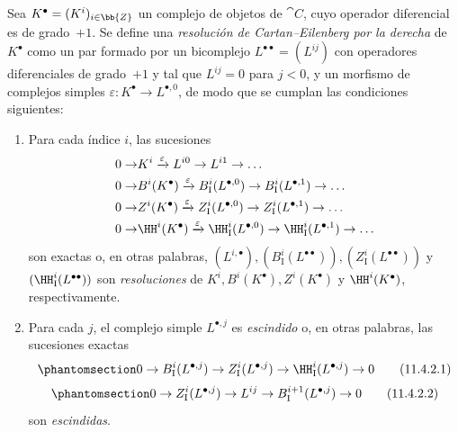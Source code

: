 \documentclass[oneside]{amsart}
\newcommand{\oldpage}[2][]{{\marginnote{\normalfont\textbf{#1}~|~#2}}\ignorespaces}
\let\EGAOriginalLabel\label
\renewcommand{\label}[1]{\phantomsection\EGAOriginalLabel{#1}}
\begin{document}
\begin{env}[11.4.2]
\label{0.11.4.2}
Sea $K^\bullet = (K^i)_{i\in\bb{Z}}$ un complejo de objetos de $\cat{C}$, cuyo operador diferencial es de grado~$+1$.
Se define una \emph{resolución de Cartan--Eilenberg por la derecha} de $K^\bullet$ como un par formado por un bicomplejo $L^{\bullet\bullet} = (L^{ij})$ con operadores diferenciales de grado~$+1$ y tal que $L^{ij}=0$ para $j<0$, y un morfismo de complejos simples $\varepsilon: K^\bullet \rightarrow L^{\bullet, 0}$, de modo que se cumplan las condiciones siguientes:
\oldpage[0\textsubscript{III}]{33}
\begin{enumerate}
  \item[(i)] Para cada índice $i$, las sucesiones
    \[
      \begin{aligned}
        0 \rightarrow
        & K^i
        \xrightarrow{\varepsilon} L^{i0}
        \rightarrow L^{i1}
        \rightarrow \ldots
      \\0 \rightarrow
        & B^i(K^\bullet)
        \xrightarrow{\varepsilon} B_\mathrm{I}^i(L^{\bullet,0})
        \rightarrow B_\mathrm{I}^i(L^{\bullet,1})
        \rightarrow \ldots
      \\0 \rightarrow
        & Z^i(K^\bullet)
        \xrightarrow{\varepsilon} Z_\mathrm{I}^i(L^{\bullet,0})
        \rightarrow Z_\mathrm{I}^i(L^{\bullet,1})
        \rightarrow \ldots
      \\0 \rightarrow
        & \HH^i(K^\bullet)
        \xrightarrow{\varepsilon} \HH_\mathrm{I}^i(L^{\bullet,0})
        \rightarrow \HH_\mathrm{I}^i(L^{\bullet,1})
        \rightarrow \ldots
      \end{aligned}
    \]
    son exactas o, en otras palabras, $(L^{i,\bullet}), (B_\mathrm{I}^i(L^{\bullet\bullet})), (Z_\mathrm{I}^i(L^{\bullet\bullet}))$ y $(\HH_\mathrm{I}^i(L^{\bullet\bullet}))$ son \emph{resoluciones} de $K^i, B^i(K^\bullet), Z^i(K^\bullet)$ y $\HH^i(K^\bullet)$, respectivamente.
  \item[(ii)] Para cada $j$, el complejo simple $L^{\bullet, j}$ es \emph{escindido} o, en otras palabras, las sucesiones exactas
    \[
      \label{0.11.4.2.1}
      0 \rightarrow B_\mathrm{I}^i(L^{\bullet,j}) \rightarrow Z_\mathrm{I}^i(L^{\bullet,j}) \rightarrow \HH_\mathrm{I}^i(L^{\bullet,j}) \rightarrow 0
      \tag{11.4.2.1}
    \]
    \[
      \label{0.11.4.2.2}
      0 \rightarrow Z_\mathrm{I}^i(L^{\bullet,j}) \rightarrow L^{ij} \rightarrow B_\mathrm{I}^{i+1}(L^{\bullet,j}) \rightarrow 0
      \tag{11.4.2.2}
    \]
    son \emph{escindidas}.
\end{enumerate}


\end{env}
\end{document}

